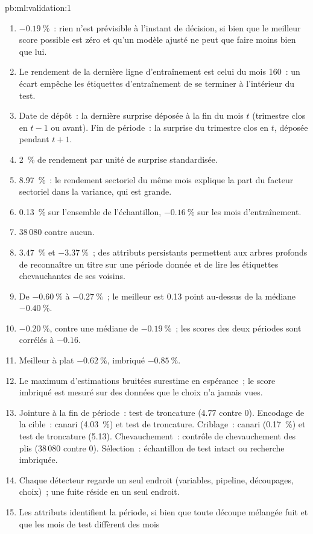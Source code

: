 \begin{solution}{pb:ml:validation:1}
\begin{enumerate}
\item $-0.19~\%$~: rien n'est prévisible à l'instant de décision, si bien que le meilleur score possible est zéro et qu'un modèle ajusté ne peut que
faire moins bien que lui.
\item Le rendement de la dernière ligne d'entraînement est celui du mois 160~: un écart empêche les étiquettes d'entraînement de se terminer à l'intérieur du test.
\item Date de dépôt~: la dernière surprise déposée à la fin du mois $t$ (trimestre clos en $t-1$ ou avant). Fin de période~: la
surprise du trimestre clos en $t$, déposée pendant $t+1$.
\item 2~\% de rendement par unité de surprise standardisée.
\item 8.97~\%~: le rendement sectoriel du même mois explique la part du facteur sectoriel dans la variance, qui est grande.
\item 0.13~\% sur l'ensemble de l'échantillon, $-0.16~\%$ sur les mois d'entraînement.
\item 38\,080 contre aucun.
\item 3.47~\% et $-3.37~\%$~; des attributs persistants permettent aux arbres profonds de reconnaître un titre sur une période donnée et
de lire les étiquettes chevauchantes de ses voisins.
\item De $-0.60~\%$ à $-0.27~\%$~; le meilleur est 0.13 point au-dessus de la médiane $-0.40~\%$.
\item $-0.20~\%$, contre une médiane de $-0.19~\%$~; les scores des deux périodes sont corrélés à $-0.16$.
\item Meilleur à plat $-0.62~\%$, imbriqué $-0.85~\%$.
\item Le maximum d'estimations bruitées surestime en espérance~; le score imbriqué est mesuré sur des données que le choix n'a jamais
vues.
\item Jointure à la fin de période~: test de troncature (4.77 contre 0). Encodage de la cible~: canari (4.03~\%) et test de troncature.
Criblage~: canari (0.17~\%) et test de troncature (5.13). Chevauchement~: contrôle de chevauchement des plis (38\,080 contre 0). Sélection~:
échantillon de test intact ou recherche imbriquée.
\item Chaque détecteur regarde un seul endroit (variables, pipeline, découpages, choix)~; une fuite réside en un seul endroit.
\item Les attributs identifient la période, si bien que toute découpe mélangée fuit et que les mois de test diffèrent des mois

\end{enumerate}
\end{solution}
